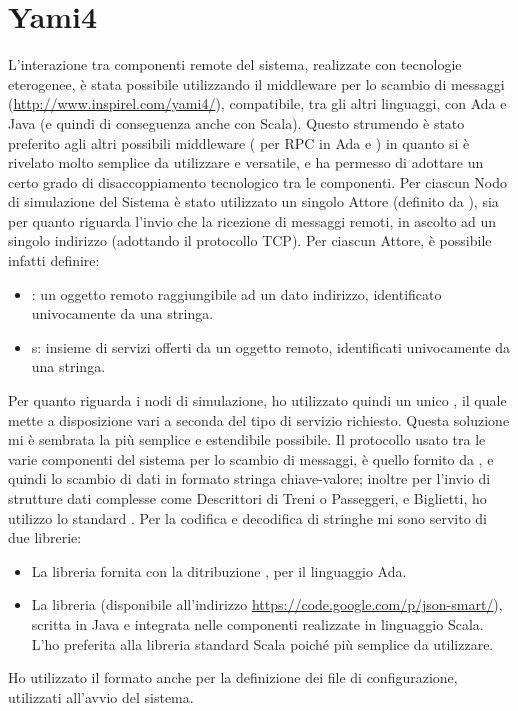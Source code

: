 	\section{Yami4}
L'interazione tra componenti remote del sistema, realizzate con tecnologie eterogenee, è stata possibile utilizzando il middleware per lo scambio di messaggi  (\url{http://www.inspirel.com/yami4/}), compatibile, tra gli altri linguaggi, con Ada e Java (e quindi di conseguenza anche con Scala). Questo strumendo è stato preferito agli altri possibili middleware ( per RPC in Ada e ) in quanto si è rivelato molto semplice da utilizzare e versatile, e ha permesso di adottare un certo grado di disaccoppiamento tecnologico tra le componenti. Per ciascun Nodo di simulazione del Sistema è stato utilizzato un singolo Attore (definito da ), sia per quanto riguarda l'invio che la ricezione di messaggi remoti, in ascolto ad un singolo indirizzo (adottando il protocollo TCP). Per ciascun Attore, è possibile infatti definire:
	\begin{itemize}
		\item {}: un oggetto remoto raggiungibile ad un dato indirizzo, identificato univocamente da una stringa.
		\item {}s: insieme di servizi offerti da un oggetto remoto, identificati univocamente da una stringa.
	\end{itemize}
Per quanto riguarda i nodi di simulazione, ho utilizzato quindi un unico , il quale mette a disposizione vari  a seconda del tipo di servizio richiesto. Questa soluzione mi è sembrata la più semplice e estendibile possibile.
Il protocollo usato tra le varie componenti del sistema per lo scambio di messaggi, è quello fornito da , e quindi lo scambio di dati in formato stringa chiave-valore; inoltre per l'invio di strutture dati complesse come Descrittori di Treni o Passeggeri, e Biglietti, ho utilizzo lo standard . Per la codifica e decodifica di stringhe  mi sono servito di due librerie:
	\begin{itemize}
		\item La libreria  fornita con la ditribuzione , per il linguaggio Ada.
		\item La libreria  (disponibile all'indirizzo \url{https://code.google.com/p/json-smart/}), scritta in Java e integrata nelle componenti realizzate in linguaggio Scala. L'ho preferita alla libreria standard Scala  poiché più semplice da utilizzare.
		
	\end{itemize}
	Ho utilizzato il formato  anche per la definizione dei file di configurazione, utilizzati all'avvio del sistema.



